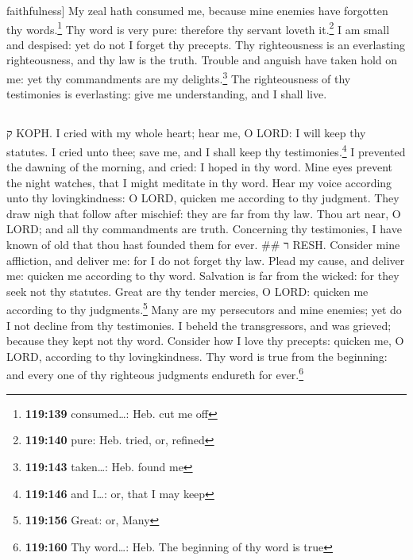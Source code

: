 faithfulness{]}  My zeal hath consumed me, because mine
enemies have forgotten thy words.\footnote{\textbf{119:139}
  consumed\ldots: Heb. cut me off}  Thy word is very
pure: therefore thy servant loveth it.\footnote{\textbf{119:140} pure:
  Heb. tried, or, refined}  I am small and despised: yet
do not I forget thy precepts.  Thy righteousness is an
everlasting righteousness, and thy law is the truth. 
Trouble and anguish have taken hold on me: yet thy commandments are my
delights.\footnote{\textbf{119:143} taken\ldots: Heb. found me}
 The righteousness of thy testimonies is everlasting:
give me understanding, and I shall live.

\hypertarget{section-120}{%
\subsection{}\label{section-120}}

ק KOPH.  I cried with my whole heart; hear me, O LORD: I
will keep thy statutes.  I cried unto thee; save me, and
I shall keep thy testimonies.\footnote{\textbf{119:146} and I\ldots: or,
  that I may keep}  I prevented the dawning of the
morning, and cried: I hoped in thy word.  Mine eyes
prevent the night watches, that I might meditate in thy word.
 Hear my voice according unto thy lovingkindness: O
LORD, quicken me according to thy judgment.  They draw
nigh that follow after mischief: they are far from thy law.
 Thou art near, O LORD; and all thy commandments are
truth.  Concerning thy testimonies, I have known of old
that thou hast founded them for ever. \#\# ר RESH. 
Consider mine affliction, and deliver me: for I do not forget thy law.
 Plead my cause, and deliver me: quicken me according to
thy word.  Salvation is far from the wicked: for they
seek not thy statutes.  Great are thy tender mercies, O
LORD: quicken me according to thy judgments.\footnote{\textbf{119:156}
  Great: or, Many}  Many are my persecutors and mine
enemies; yet do I not decline from thy testimonies.  I
beheld the transgressors, and was grieved; because they kept not thy
word.  Consider how I love thy precepts: quicken me, O
LORD, according to thy lovingkindness.  Thy word is true
from the beginning: and every one of thy righteous judgments endureth
for ever.\footnote{\textbf{119:160} Thy word\ldots: Heb. The beginning
  of thy word is true}

